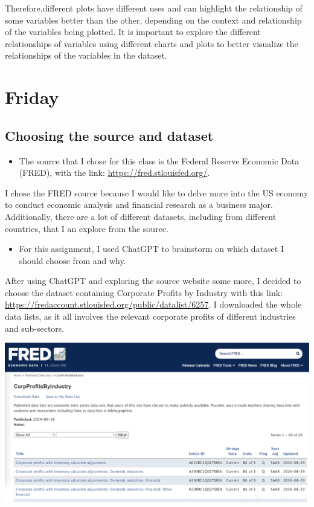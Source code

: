 \documentclass[
  letterpaper,
  DIV=11,
  numbers=noendperiod]{scrreprt}
\providecommand{\tightlist}{%
  \setlength{\itemsep}{0pt}\setlength{\parskip}{0pt}}\usepackage{longtable,booktabs,array}
\begin{document}
Therefore,different plots have different uses and can highlight the
relationship of some variables better than the other, depending on the
context and relationship of the variables being plotted. It is important
to explore the different relationships of variables using different
charts and plots to better visualize the relationships of the variables
in the dataset.

\section{Friday}\label{friday-2}

\subsection{Choosing the source and
dataset}\label{choosing-the-source-and-dataset}

\begin{itemize}
\tightlist
\item
  The source that I chose for this class is the Federal Reserve Economic
  Data (FRED), with the link: \url{https://fred.stlouisfed.org/}.
\end{itemize}

I chose the FRED source because I would like to delve more into the US
economy to conduct economic analysis and financial research as a
business major. Additionally, there are a lot of different datasets,
including from different countries, that I an explore from the source.

\begin{itemize}
\tightlist
\item
  For this assignment, I used ChatGPT to brainstorm on which dataset I
  should choose from and why.
\end{itemize}

After using ChatGPT and exploring the source website some more, I
decided to choose the dataset containing Corporate Profits by Industry
with this link:
\url{https://fredaccount.stlouisfed.org/public/datalist/6257}. I
downloaded the whole data lists, as it all involves the relevant
corporate profits of different industries and sub-sectors.

\includegraphics{./Excel_1_Unit/Week1_Janice/Week 1/Week 1 Friday/Download_data.png}
\end{document}
